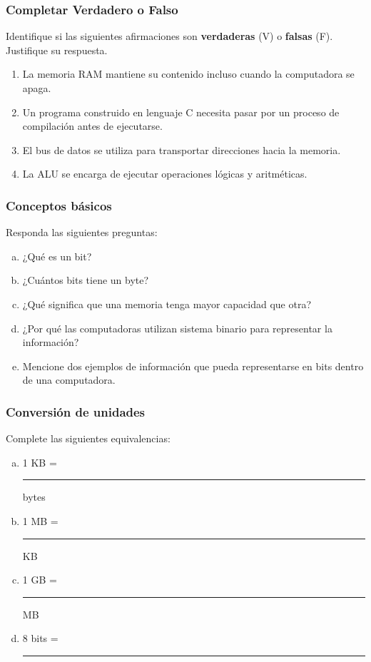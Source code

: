 \begin{ejercicioClase}
    \subsubsection{Completar Verdadero o Falso}
    Identifique si las siguientes afirmaciones son \textbf{verdaderas} (V) o \textbf{falsas} (F). Justifique su respuesta.
    \begin{enumerate}[label=\alph*)]
        \item La memoria RAM mantiene su contenido incluso cuando la computadora se apaga.
        \item Un programa construido en lenguaje C necesita pasar por un proceso de compilación antes de ejecutarse.
        \item El bus de datos se utiliza para transportar direcciones hacia la memoria.
        \item La ALU se encarga de ejecutar operaciones lógicas y aritméticas.
    \end{enumerate}

    \subsubsection{Conceptos básicos}
    Responda las siguientes preguntas:
    \begin{enumerate}[a)]
      \item ¿Qué es un bit?
      \item ¿Cuántos bits tiene un byte?
      \item ¿Qué significa que una memoria tenga mayor capacidad que otra?
      \item ¿Por qué las computadoras utilizan sistema binario para representar la información?
      \item Mencione dos ejemplos de información que pueda representarse en bits dentro de una computadora.
    \end{enumerate}
    
    \subsubsection{Conversión de unidades}
    Complete las siguientes equivalencias:
    \begin{enumerate}[a)]
      \item 1 KB = \rule{3cm}{0.1pt} bytes
      \item 1 MB = \rule{3cm}{0.1pt} KB
      \item 1 GB = \rule{3cm}{0.1pt} MB
      \item 8 bits = \rule{3cm}{0.1pt}
    \end{enumerate}
\end{ejercicioClase}

